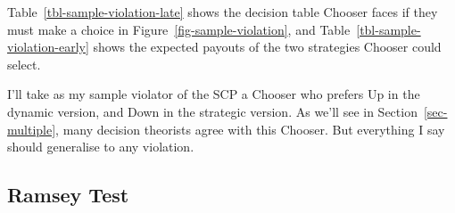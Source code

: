 \documentclass[
  11pt,
  letterpaper,
  DIV=11,
  numbers=noendperiod,
  twoside]{scrartcl}
\begin{document}
Table~\ref{tbl-sample-violation-late} shows the decision table Chooser
faces if they must make a choice in Figure~\ref{fig-sample-violation},
and Table~\ref{tbl-sample-violation-early} shows the expected payouts of
the two strategies Chooser could select.

\begin{table}

\caption{\label{tbl-sample-violation}Payout tables for
Figure~\ref{fig-sample-violation}.}

\begin{minipage}{0.50\linewidth}



\end{minipage}%
%
\begin{minipage}{0.50\linewidth}



\end{minipage}%

\end{table}%

I'll take as my sample violator of the SCP a Chooser who prefers Up in
the dynamic version, and Down in the strategic version. As we'll see in
Section~\ref{sec-multiple}, many decision theorists agree with this
Chooser. But everything I say should generalise to any violation.

\subsection{Ramsey Test}\label{sec-ramsey}
\end{document}
